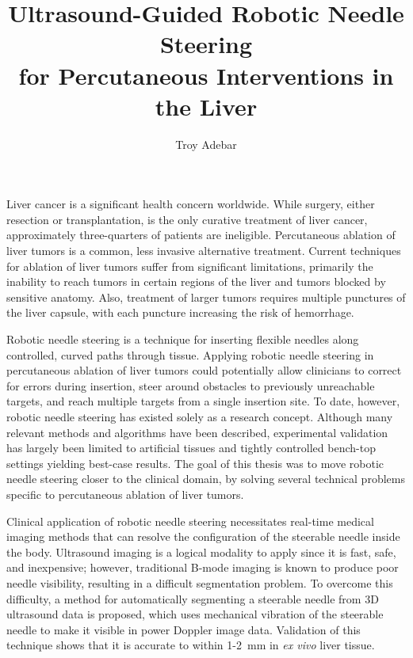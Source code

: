 \documentclass[12pt,twoside]{report}
\begin{document}
\renewcommand{\thepage}{\roman{page}}%

\title{Ultrasound-Guided Robotic Needle Steering\\
            for Percutaneous Interventions in the Liver}
\author{Troy Adebar}
\onlinetrue

 
\beforepreface
Liver cancer is a significant health concern worldwide. While surgery, either resection or transplantation, is the only curative treatment of liver cancer, approximately three-quarters of patients are ineligible. Percutaneous ablation of liver tumors is a common, less invasive alternative treatment. Current techniques for ablation of liver tumors suffer from significant limitations, primarily the inability to reach tumors in certain regions of the liver and tumors blocked by sensitive anatomy. Also, treatment of larger tumors requires multiple punctures of the liver capsule, with each puncture increasing the risk of hemorrhage.

Robotic needle steering is a technique for inserting flexible needles along controlled, curved paths through tissue. Applying robotic needle steering in percutaneous ablation of liver tumors could potentially allow clinicians to correct for errors during insertion, steer around obstacles to previously unreachable targets, and reach multiple targets from a single insertion site. To date, however, robotic needle steering has existed solely as a research concept. Although many relevant methods and algorithms have been described, experimental validation has largely been limited to artificial tissues and tightly controlled bench-top settings yielding best-case results. The goal of this thesis was to move robotic needle steering closer to the clinical domain, by solving several technical problems specific to percutaneous ablation of liver tumors.

Clinical application of robotic needle steering necessitates real-time medical imaging methods that can resolve the configuration of the steerable needle inside the body. Ultrasound imaging is a logical modality to apply since it is fast, safe, and inexpensive; however, traditional B-mode imaging is known to produce poor needle visibility, resulting in a difficult segmentation problem. To overcome this difficulty, a method for automatically segmenting a steerable needle from 3D ultrasound data is proposed, which uses mechanical vibration of the steerable needle to make it visible in power Doppler image data. Validation of this technique shows that it is accurate to within 1-2~mm in \textit{ex vivo} liver tissue.
\end{document}
